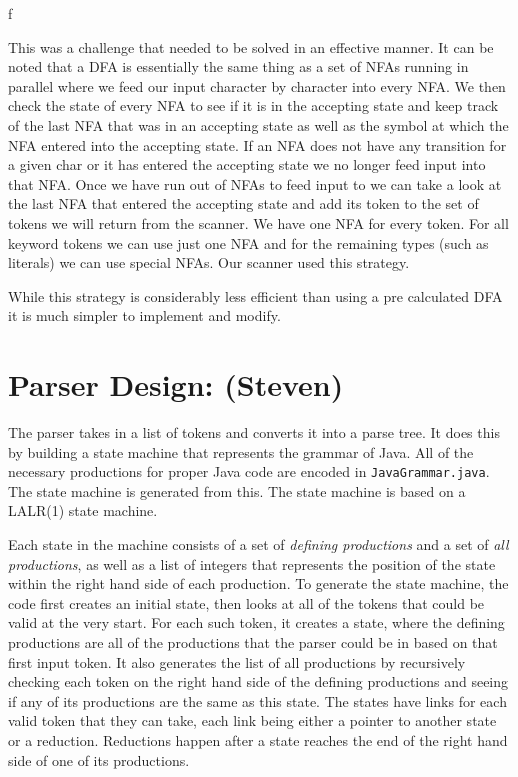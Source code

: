 f\documentclass[12pt]{article}
\begin{document}
This was a challenge that needed to be solved in an effective manner. It can be noted that a DFA is
essentially the same thing as a set of NFAs running in parallel where we feed our input character by
character into every NFA. We then check the state of every NFA to see if it is in the accepting
state and keep track of the last NFA that was in an accepting state as well as the symbol at which
the NFA entered into the accepting state. If an NFA does not have any transition for a given char or
it has entered the accepting state we no longer feed input into that NFA. Once we have run out of
NFAs to feed input to we can take a look at the last NFA that entered the accepting state and add
its token to the set of tokens we will return from the scanner. We have one NFA for every token. For
all keyword tokens we can use just one NFA and for the remaining types (such as literals) we can use
special NFAs. Our scanner used this strategy.

While this strategy is considerably less efficient than using a pre calculated DFA it is much
simpler to implement and modify.


\section*{Parser Design: (Steven)}

The parser takes in a list of tokens and converts it into a parse tree.  It does this by building a
state machine that represents the grammar of Java.  All of the necessary productions for proper Java
code are encoded in \texttt{JavaGrammar.java}.  The state machine is generated from this.  The state
machine is based on a LALR(1) state machine.

Each state in the machine consists of a set of \textit{defining productions} and a set of
\textit{all productions}, as well as a list of integers that represents the position of the state
within the right hand side of each production. To generate the state machine, the code first creates
an initial state, then looks at all of the tokens that could be valid at the very start.  For each
such token, it creates a state, where the defining productions are all of the productions that the
parser could be in based on that first input token.  It also generates the list of all productions
by recursively checking each token on the right hand side of the defining productions and seeing if
any of its productions are the same as this state.  The states have links for each valid token that
they can take, each link being either a pointer to another state or a reduction.  Reductions happen
after a state reaches the end of the right hand side of one of its productions.
\end{document}
